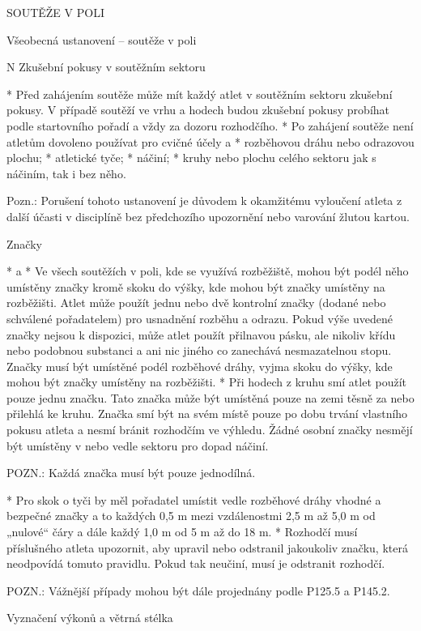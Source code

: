 \sec SOUTĚŽE V POLI

\secc Všeobecná ustanovení -- soutěže v poli

\begitems \style N
Zkušební pokusy v soutěžním sektoru

* Před zahájením soutěže může mít každý atlet v soutěžním sektoru zkušební pokusy. V případě soutěží ve vrhu a hodech budou zkušební pokusy probíhat podle startovního pořadí a vždy za dozoru rozhodčího.
* Po zahájení soutěže není atletům dovoleno používat pro cvičné účely
  \begitems \style a
  * rozběhovou dráhu nebo odrazovou plochu;
  * atletické tyče;
  * náčiní;
  * kruhy nebo plochu celého sektoru jak s náčiním, tak i bez něho.
  \enditems

Pozn.: Porušení tohoto ustanovení je důvodem k okamžitému vyloučení atleta z další účasti v disciplíně bez předchozího upozornění nebo varování žlutou kartou.

Značky

* \begitems \style a
  * Ve všech soutěžích v poli, kde se využívá rozběžiště, mohou být podél něho umístěny značky kromě skoku do výšky, kde mohou být značky umístěny na rozběžišti. Atlet může použít jednu nebo dvě kontrolní značky (dodané nebo schválené pořadatelem) pro usnadnění rozběhu a odrazu. Pokud výše uvedené značky nejsou k dispozici, může atlet použít přilnavou pásku, ale nikoliv křídu nebo podobnou substanci a ani nic jiného co  zanechává nesmazatelnou stopu. Značky musí být umístěné podél rozběhové dráhy, vyjma skoku do výšky, kde mohou být značky umístěny na rozběžišti.
  * Při hodech z kruhu smí atlet použít pouze jednu značku. Tato značka může být umístěná pouze na zemi těsně za nebo přilehlá ke kruhu. Značka smí být na svém místě pouze po dobu trvání vlastního pokusu atleta a nesmí bránit rozhodčím ve výhledu. Žádné osobní značky  nesmějí být umístěny v nebo vedle sektoru pro dopad náčiní.

  POZN.: Každá značka musí být pouze jednodílná.

  * Pro skok o tyči by měl pořadatel umístit vedle rozběhové dráhy vhodné a bezpečné značky a to každých 0,5 m mezi vzdálenostmi  2,5 m až 5,0 m od „nulové“ čáry a dále každý 1,0 m od 5 m až do 18 m.
  * Rozhodčí musí příslušného atleta upozornit, aby upravil nebo odstranil jakoukoliv značku, která neodpovídá tomuto pravidlu. Pokud tak neučiní, musí je odstranit rozhodčí.

  POZN.: Vážnější případy mohou být dále projednány podle P125.5 a P145.2.
  \enditems

Vyznačení výkonů a větrná stélka

